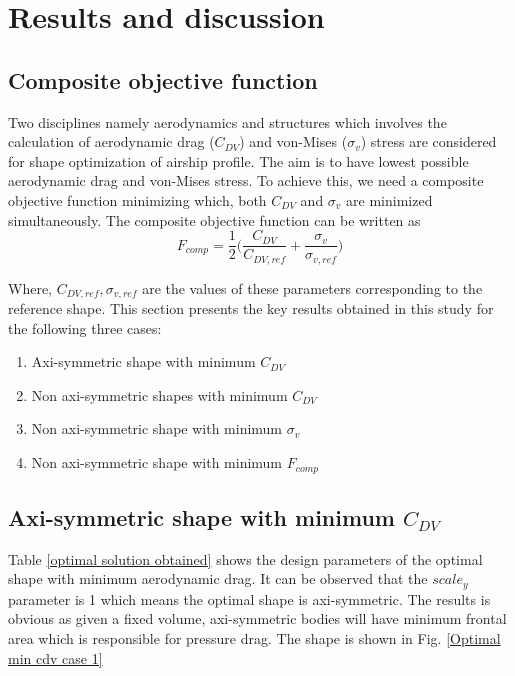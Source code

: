 \chapter{Results and discussion}
\label{Final results}

\section{Composite objective function}
Two disciplines namely aerodynamics and structures which involves the calculation of aerodynamic drag ($ C_{DV} $) and von-Mises ($ \sigma _{v} $) stress are considered for shape optimization of airship profile. The aim is to have lowest possible aerodynamic drag and von-Mises stress. To achieve this, we need a composite objective function minimizing which, both $ C_{DV} $ and $ \sigma _{v} $ are minimized simultaneously. The composite objective function can be written as
\begin{equation}
F_{comp} = \frac{1}{2}\bigg( \frac{C_{DV}}{C_{DV,ref}} + \dfrac{\sigma _{v}}{\sigma _{v,ref}} \bigg)
\end{equation}

Where, $C_{DV,ref} , \sigma _{v,ref}  $ are the values of these parameters corresponding to the reference shape. This section presents the key results obtained in this study for the following three cases:
\begin{enumerate}
\item Axi-symmetric shape with minimum $ C_{DV}$ 
\item Non axi-symmetric shapes with minimum $ C_{DV}$
\item Non axi-symmetric shape with minimum $ \sigma_{v}$ 
\item Non axi-symmetric shape with minimum $ F_{comp}$ 

\end{enumerate}

\section{Axi-symmetric shape with minimum $ C_{DV}$}
Table \ref{optimal solution obtained} shows the design parameters of the optimal shape with minimum aerodynamic drag. It can be observed that the $ scale_y $ parameter is 1 which means the optimal shape is axi-symmetric. The results is obvious as given a fixed volume, axi-symmetric bodies will have minimum frontal area which is responsible for pressure drag. The shape is shown in Fig. \ref{Optimal min cdv case 1}

